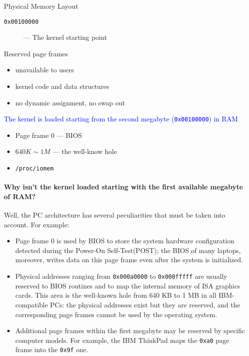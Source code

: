 \begin{frame}{Physical Memory Layout}
  \begin{description}
  \item[\texttt{0x00100000}]--- The kernel starting point
  \end{description}
  \begin{minipage}{.49\textwidth}
    \begin{block}{Reserved page frames}
      \begin{itemize}
      \item unavailable to users
      \item kernel code and data structures
      \item no dynamic assignment, no swap out
      \end{itemize}
    \end{block}
    \textcolor{blue}{The kernel is loaded starting from the second megabyte (\texttt{0x00100000})
      in RAM}
    \begin{itemize}
    \item Page frame 0 --- BIOS
    \item $640K\sim{}1M$ --- the well-know hole
    \item \texttt{/proc/iomem}
    \end{itemize}
  \end{minipage}\hfill
  \begin{minipage}{.49\textwidth}
     
  \end{minipage}
\end{frame}

\paragraph{Why isn't the kernel loaded starting with the first available megabyte of RAM?}

 Well, the PC architecture has
several peculiarities that must be taken into account. For example:

\begin{itemize}
\item Page frame 0 is used by BIOS to store the system hardware configuration detected
  during the Power-On Self-Test(POST); the BIOS of many laptops, moreover, writes data on
  this page frame even after the system is initialized.
\item Physical addresses ranging from \texttt{0x000a0000} to \texttt{0x000fffff} are usually
  reserved to BIOS routines and to map the internal memory of ISA graphics cards. This
  area is the well-known hole from 640 KB to 1 MB in all IBM-compatible PCs: the physical
  addresses exist but they are reserved, and the corresponding page frames cannot be used
  by the operating system.
\item Additional page frames within the first megabyte may be reserved by specific
  computer models. For example, the IBM ThinkPad maps the \texttt{0xa0} page frame into
  the \texttt{0x9f} one.
\end{itemize}

